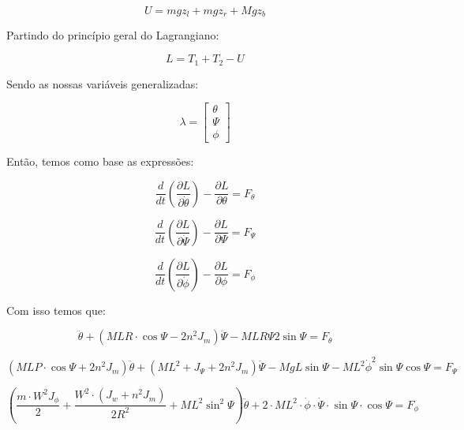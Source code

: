 \documentclass[12pt]{article}
\begin{document}
\begin{equation}
    U = mgz_l + mgz_r + Mgz_b
\end{equation}

Partindo do princípio geral do Lagrangiano:

\begin{equation}
    L = T_1 + T_2 - U
\end{equation}

Sendo as nossas variáveis generalizadas:

\begin{equation}
    \lambda = 
    \begin{bmatrix}
    \theta\\
    \Psi \\
    \phi
    \end{bmatrix}
\end{equation}

Então, temos como base as expressões:

\begin{equation}
    \frac{d}{dt}\left(\frac{\partial L}{\partial \Dot{\theta}}\right) - \frac{\partial L}{\partial \theta} = F_{\theta}
\end{equation}

\begin{equation}
    \frac{d}{dt}\left(\frac{\partial L}{\partial \Dot{\Psi}}\right) - \frac{\partial L}{\partial \Psi} = F_{\Psi}
\end{equation}

\begin{equation}
    \frac{d}{dt}\left(\frac{\partial L}{\partial \Dot{\phi}}\right) - \frac{\partial L}{\partial \phi} = F_{\phi}
\end{equation}

Com isso temos que:

\begin{equation}
    [(2m + M) R^2 + 2J_w + 2n^2J_m)]\ddot{\theta} + \left(MLR \cdot \cos{\Psi} - 2n^2J_m\right)\ddot{\Psi} - MLR \Psi 2\sin{\Psi} = F_{\theta}
\end{equation}

\begin{equation}
    (MLP \cdot \cos{\Psi} + 2n^2 J_m) \ddot{\theta} + (ML^2 + J_{\Psi} + 2n^2J_m)\ddot{\Psi} - MgL\sin{\Psi} - ML^2\dot{{\phi}}^2\sin{\Psi}\cos{\Psi} = F_{\Psi}
\end{equation}

\begin{equation}
    \left (\frac{m \cdot W^2 J_{\phi}}{2} + \frac{W^2 \cdot (J_w + n^2J_m)}{2R^2} + ML^2{\sin^2{\Psi}} \right)\ddot{\theta} + 2\cdot ML^2 \cdot \dot{\phi} \cdot  \dot{\Psi} \cdot  \sin{\Psi} \cdot \cos{\Psi} = F_{\phi} 
\end{equation}
\end{document}
